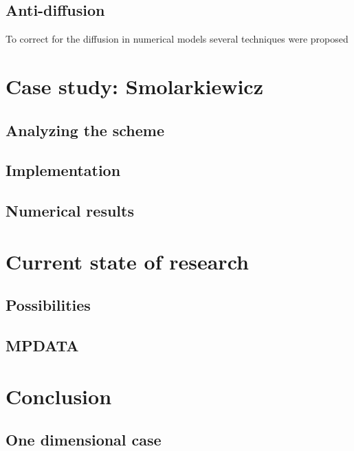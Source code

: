 \documentclass[12pt, a4paper]{article}
\begin{document}
\subsection{Anti-diffusion}
To correct for the diffusion in numerical models several techniques were proposed
\section{Case study: Smolarkiewicz}
\subsection{Analyzing the scheme}
\subsection{Implementation}
\subsection{Numerical results}
\section{Current state of research}
\subsection{Possibilities}
\subsection{MPDATA}
\section{Conclusion}



\subsection{One dimensional case}
\end{document}
